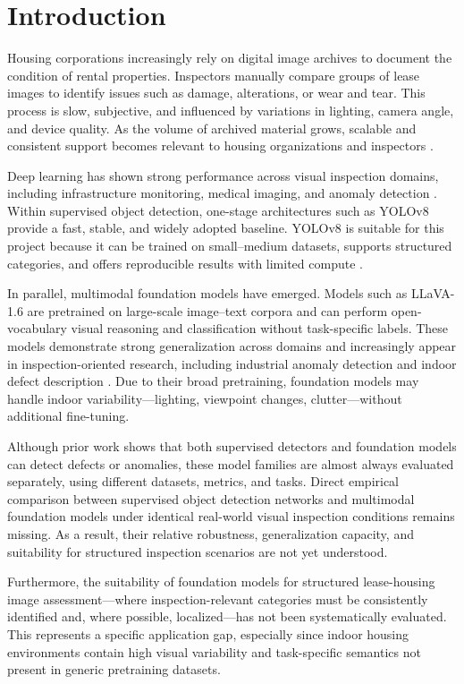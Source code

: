 \section{Introduction}
\label{sec:introduction}
Housing corporations increasingly rely on digital image archives to document the condition of rental properties. Inspectors manually compare groups of lease images to identify issues such as damage, alterations, or wear and tear. This process is slow, subjective, and influenced by variations in lighting, camera angle, and device quality. As the volume of archived material grows, scalable and consistent support becomes relevant to housing organizations and inspectors \cite{Kang_Kim_Kim_2025}.

Deep learning has shown strong performance across visual inspection domains, including infrastructure monitoring, medical imaging, and anomaly detection \cite{Cheng_Huang_Li_Lyu_Xu_Zhao_Zhao_Xiang_2024}. Within supervised object detection, one-stage architectures such as YOLOv8 provide a fast, stable, and widely adopted baseline. YOLOv8 is suitable for this project because it can be trained on small–medium datasets, supports structured categories, and offers reproducible results with limited compute \cite{Gonçalves_Santos_2023}.

In parallel, multimodal foundation models have emerged. Models such as LLaVA-1.6 are pretrained on large-scale image–text corpora and can perform open-vocabulary visual reasoning and classification without task-specific labels. These models demonstrate strong generalization across domains and increasingly appear in inspection-oriented research, including industrial anomaly detection and indoor defect description \cite{Jiang_Li_Deng_Liu_Gao_Zhou_Li_Wang_Zheng_2025, Wen_Chen_2024}. Due to their broad pretraining, foundation models may handle indoor variability—lighting, viewpoint changes, clutter—without additional fine-tuning.

Although prior work shows that both supervised detectors and foundation models can detect defects or anomalies, these model families are almost always evaluated separately, using different datasets, metrics, and tasks. Direct empirical comparison between supervised object detection networks and multimodal foundation models under identical real-world visual inspection conditions remains missing. As a result, their relative robustness, generalization capacity, and suitability for structured inspection scenarios are not yet understood.

Furthermore, the suitability of foundation models for structured lease-housing image assessment—where inspection-relevant categories must be consistently identified and, where possible, localized—has not been systematically evaluated. This represents a specific application gap, especially since indoor housing environments contain high visual variability and task-specific semantics not present in generic pretraining datasets.

